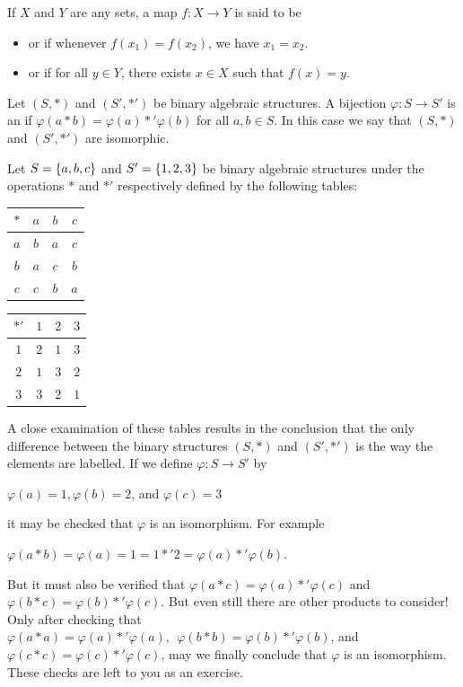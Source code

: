 \documentclass[11pt,fleqn,dvipsnames,usenames]{article}
\newcommand{\p}{\noindent}
\begin{document}
\recall If $X$ and $Y$ are any sets, a map $f:X\to Y$ is said to be
\begin{itemize}
\item {} or  if whenever $f(x_{1}) = f(x_{2})$, we have $x_{1} = x_{2}$.
\item {} or  if for all $y\in Y$, there exists $x\in X$ such that $f(x) = y$.
\end{itemize}
%
\begin{definition}
Let $(S,*)$ and $(S',*')$ be binary algebraic structures.  A bijection $\varphi:S\to S'$ is an  if $\varphi(a*b) = \varphi(a)*'\varphi(b)$ for all $a,b\in S$.  In this case we say that $(S,*)$ and $(S',*')$ are isomorphic.
\end{definition}
%
\begin{example}\label{firstisomorphismexample}
Let $S = \left\{a,b,c\right\}$ and $S' = \left\{1,2,3\right\}$ be binary algebraic structures under the operations $*$ and $*'$ respectively defined by the following tables:
\begin{center}
\bgroup
\begin{center}
\def\arraystretch{1.5}
\begin{tabular}{c|ccc}
$*$ & $a$ & $b$ & $c$\\
\hline
$a$ & $b$ & $a$ & $c$\\
$b$ & $a$ & $c$ & $b$\\
$c$ & $c$ & $b$ & $a$\\
\end{tabular}
\hspace{3cm}
\begin{tabular}{c|ccc}
$*'$ & $1$ & $2$ & $3$\\
\hline
$1$ & $2$ & $1$ & $3$\\
$2$ & $1$ & $3$ & $2$\\
$3$ & $3$ & $2$ & $1$\\
\end{tabular}
\end{center}
\egroup
\end{center}
\p A close examination of these tables results in the conclusion that the only difference between the binary structures $(S,*)$ and $(S', *')$ is the way the elements are labelled.  If we define $\varphi:S\to S'$ by
\begin{center}
$\varphi(a) = 1, \varphi(b) = 2$, and $\varphi(c) = 3$
\end{center}
it may be checked that $\varphi$ is an isomorphism.  For example
\begin{center}
$\varphi(a*b) = \varphi(a) = 1 = 1*' 2 = \varphi(a)*'\varphi(b)$.
\end{center}
\p But it must also be verified that $\varphi(a*c) = \varphi(a)*'\varphi(c)$ and $\varphi(b*c) = \varphi(b)*'\varphi(c)$.  But even still there are other products to consider!  Only after checking that $\varphi(a*a) = \varphi(a)*'\varphi(a), \ \ \varphi(b*b) = \varphi(b)*'\varphi(b)$, and $\varphi(c*c) = \varphi(c)*'\varphi(c)$, may we finally conclude that $\varphi$ is an isomorphism.  These checks are left to you as an exercise.
\end{example}
\end{document}
